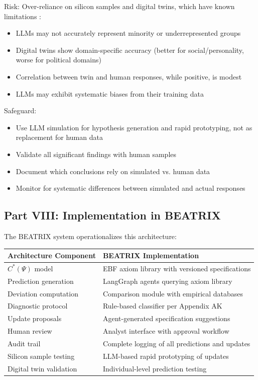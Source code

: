Risk: Over-reliance on silicon samples and digital twins, which have known 
limitations \citep{bisbee2024, sarstedt2024}:
\begin{itemize}
    \item LLMs may not accurately represent minority or underrepresented groups
    \item Digital twins show domain-specific accuracy (better for social/personality, 
          worse for political domains)
    \item Correlation between twin and human responses, while positive, is modest
    \item LLMs may exhibit systematic biases from their training data
\end{itemize}

Safeguard:
\begin{itemize}
    \item Use LLM simulation for hypothesis generation and rapid prototyping, 
          not as replacement for human data
    \item Validate all significant findings with human samples
    \item Document which conclusions rely on simulated vs. human data
    \item Monitor for systematic differences between simulated and actual responses
\end{itemize}

\subsection{Part VIII: Implementation in BEATRIX}

The BEATRIX system operationalizes this architecture:

\begin{center}
\renewcommand{\arraystretch}{1.3}
\begin{tabular}{|l|l|}
\hline
\textbf{Architecture Component} & \textbf{BEATRIX Implementation} \\
\hline
$C^*(\Psi)$ model & EBF axiom library with versioned specifications \\
Prediction generation & LangGraph agents querying axiom library \\
Deviation computation & Comparison module with empirical databases \\
Diagnostic protocol & Rule-based classifier per Appendix AK \\
Update proposals & Agent-generated specification suggestions \\
Human review & Analyst interface with approval workflow \\
Audit trail & Complete logging of all predictions and updates \\
Silicon sample testing & LLM-based rapid prototyping of updates \\
Digital twin validation & Individual-level prediction testing \\
\hline
\end{tabular}
\end{center}

